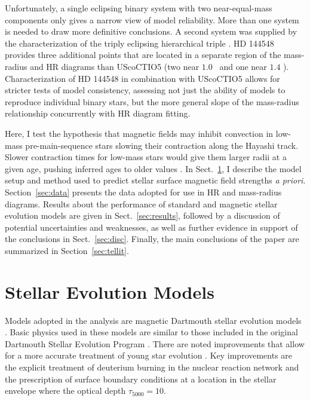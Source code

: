 \documentclass{aa}
\begin{document}
Unfortunately, a single eclipsing binary system with two near-equal-mass components only gives a narrow view of model reliability. More than one system is needed to draw more definitive conclusions. A second system was supplied by the characterization of the triply eclipsing hierarchical triple  \citep{Alonso2015}. HD 144548 provides three additional points that are located in a separate region of the mass-radius and HR diagrams than UScoCTIO5 (two near $1.0$ \msun\ and one near $1.4$ \msun). Characterization of HD 144548 in combination with UScoCTIO5 allows for stricter tests of model consistency, assessing not just the ability of models to reproduce individual binary stars, but the more general slope of the mass-radius relationship concurrently with HR diagram fitting.

Here, I test the hypothesis that magnetic fields may inhibit convection in low-mass pre-main-sequence stars slowing their contraction along the Hayashi track. Slower contraction times for low-mass stars would give them larger radii at a given age, pushing inferred ages to older values \citep[e.g.,][]{MM10, Malo2014}.  
In Sect.~\ref{sec:models}, I describe the model setup and method used to predict stellar surface magnetic field strengths \emph{a priori}. Section~\ref{sec:data} presents the data adopted for use in HR and mass-radius diagrams. Results about the performance of standard and magnetic stellar evolution models are given in Sect.~\ref{sec:results}, followed by  a discussion of potential uncertainties and weaknesses, as well as further evidence in support of the conclusions in Sect.~\ref{sec:disc}. Finally, the main conclusions of the paper are summarized in Section~\ref{sec:tellit}.


\section{Stellar Evolution Models}
\label{sec:models}
Models adopted in the analysis are magnetic Dartmouth stellar evolution models \citep{FC12b}. Basic physics used in these models are similar to those included in the original Dartmouth Stellar Evolution Program \citep[DSEP;][]{Dotter2008}. There are noted improvements that allow for a more accurate treatment of young star evolution \citep[see, e.g.,][]{Malo2014}. Key improvements are the explicit treatment of deuterium burning in the nuclear reaction network and the prescription of surface boundary conditions at a location in the stellar envelope where the optical depth $\tau_{5000} = 10$. 
\end{document}
